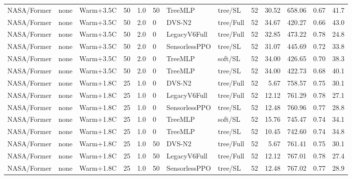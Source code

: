 \documentclass[10pt,a4paper]{article}
\begin{document}
\begin{landscape}
\begin{longtable}{llllllllrrrrr}
NASA/Former & none & Warm+3.5C & 50 & 1.0 & 50 & TreeMLP & tree/SL & 52 & 30.52 & 658.06 & 0.67 & 41.7 \\

NASA/Former & none & Warm+3.5C & 50 & 2.0 & 0 & DVS-N2 & tree/Full & 52 & 34.67 & 420.27 & 0.66 & 43.0 \\

NASA/Former & none & Warm+3.5C & 50 & 2.0 & 0 & LegacyV6Full & tree/Full & 52 & 32.85 & 473.22 & 0.78 & 24.8 \\

NASA/Former & none & Warm+3.5C & 50 & 2.0 & 0 & SensorlessPPO & tree/SL & 52 & 31.07 & 445.69 & 0.72 & 33.8 \\

NASA/Former & none & Warm+3.5C & 50 & 2.0 & 0 & TreeMLP & soft/SL & 52 & 34.00 & 426.65 & 0.70 & 38.3 \\

NASA/Former & none & Warm+3.5C & 50 & 2.0 & 0 & TreeMLP & tree/SL & 52 & 34.00 & 422.73 & 0.68 & 40.1 \\

NASA/Former & none & Warm+1.8C & 25 & 1.0 & 0 & DVS-N2 & tree/Full & 52 & 5.67 & 758.57 & 0.75 & 30.1 \\

NASA/Former & none & Warm+1.8C & 25 & 1.0 & 0 & LegacyV6Full & tree/Full & 52 & 12.12 & 761.29 & 0.78 & 27.1 \\

NASA/Former & none & Warm+1.8C & 25 & 1.0 & 0 & SensorlessPPO & tree/SL & 52 & 12.48 & 760.96 & 0.77 & 28.8 \\

NASA/Former & none & Warm+1.8C & 25 & 1.0 & 0 & TreeMLP & soft/SL & 52 & 15.76 & 745.47 & 0.74 & 34.1 \\

NASA/Former & none & Warm+1.8C & 25 & 1.0 & 0 & TreeMLP & tree/SL & 52 & 10.45 & 742.60 & 0.74 & 34.8 \\

NASA/Former & none & Warm+1.8C & 25 & 1.0 & 50 & DVS-N2 & tree/Full & 52 & 5.67 & 761.41 & 0.75 & 30.1 \\

NASA/Former & none & Warm+1.8C & 25 & 1.0 & 50 & LegacyV6Full & tree/Full & 52 & 12.12 & 767.01 & 0.78 & 27.4 \\

NASA/Former & none & Warm+1.8C & 25 & 1.0 & 50 & SensorlessPPO & tree/SL & 52 & 12.48 & 767.02 & 0.77 & 28.9 \\


\end{longtable}
\end{landscape}
\end{document}
